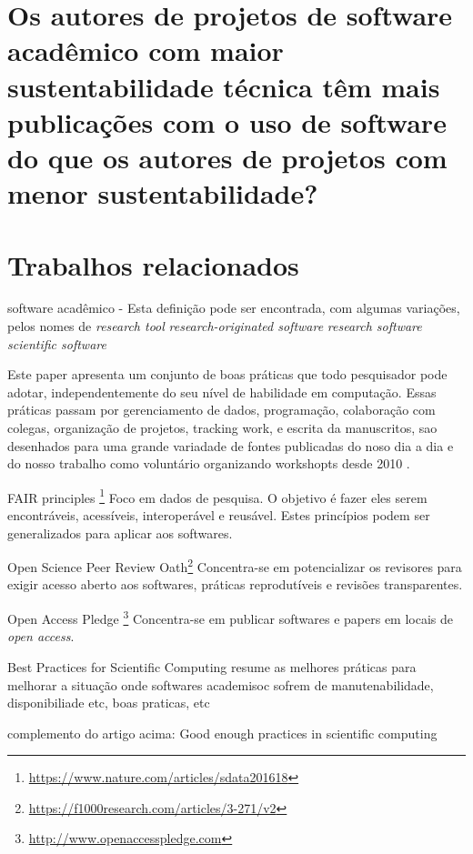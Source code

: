 \section{Os autores de projetos de software acadêmico com maior sustentabilidade técnica têm mais publicações com o uso de software do que os autores de projetos com menor sustentabilidade?}

\section{Trabalhos relacionados}

software acadêmico - Esta definição pode ser encontrada, com algumas variações, pelos nomes de
{\it research tool} %
{\it research-originated software} %
{\it research software} %
{\it scientific software} %

Este paper
apresenta um conjunto de boas práticas que todo pesquisador pode adotar,
independentemente do seu nível de habilidade em computação. Essas práticas
passam por gerenciamento de dados, programação, colaboração com colegas,
organização de projetos, tracking work, e escrita da manuscritos, sao
desenhados para uma grande variadade de fontes publicadas do noso dia a dia e
do nosso trabalho como voluntário organizando workshopts desde 2010
\cite{wilson2017good}.

FAIR principles \cite{wilkinson2016fair}\footnote{\url{https://www.nature.com/articles/sdata201618}}
Foco em dados de pesquisa. O objetivo é fazer eles serem encontráveis,
acessíveis, interoperável e reusável. Estes princípios podem ser
generalizados para aplicar aos softwares.

Open Science Peer Review Oath\footnote{\url{https://f1000research.com/articles/3-271/v2}}
Concentra-se em potencializar os revisores para exigir acesso aberto aos
softwares, práticas reprodutíveis e revisões transparentes.

Open Access Pledge \cite{holcombe2011openaccess}\footnote{\url{http://www.openaccesspledge.com}}
Concentra-se em publicar softwares e papers em locais de {\it open access}.

Best Practices for Scientific Computing \cite{wilson2014best}
resume as melhores práticas para melhorar a situação onde softwares
academisoc sofrem de manutenabilidade, disponibiliade etc, boas praticas, etc

complemento do artigo acima: 
Good enough practices in scientific computing \cite{wilson2017good}

